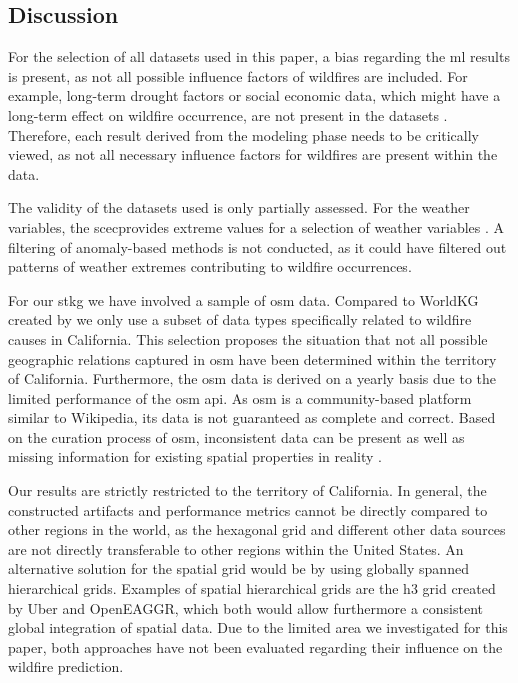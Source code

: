 \documentclass[
]{ceurart}
\begin{document}

\subsection{Discussion} \label{cha:Discussion}
For the selection of all datasets used in this paper, a bias regarding the \gls*{ml} results is present, as not all possible influence factors of wildfires are included. For example, long-term drought factors or social economic data, which might have a long-term effect on wildfire occurrence, are not present in the datasets \cite{Littell.2018}. Therefore, each result derived from the modeling phase needs to be critically viewed, as not all necessary influence factors for wildfires are present within the data.

The validity of the datasets used is only partially assessed. For the weather variables, the \gls*{scec}provides extreme values for a selection of weather variables \cite{StateClimateExtremesCommittee.2022}. A filtering of anomaly-based methods is not conducted, as it could have filtered out patterns of weather extremes contributing to wildfire occurrences.

For our \gls*{stkg} we have involved a sample of \gls*{osm} data. Compared to WorldKG created by \cite{Tempelmeier.2021} we only use a subset of data types specifically related to wildfire causes in California. This selection proposes the situation that not all possible geographic relations captured in \gls*{osm} have been determined within the territory of California. Furthermore, the \gls*{osm} data is derived on a yearly basis due to the limited performance of the \gls*{osm} \gls*{api}. As \gls*{osm} is a community-based platform similar to Wikipedia, its data is not guaranteed as complete and correct. Based on the curation process of \gls*{osm}, inconsistent data can be present as well as missing information for existing spatial properties in reality \cite{Basiri.2016}.

Our results are strictly restricted to the territory of California. In general, the constructed artifacts and performance metrics cannot be directly compared to other regions in the world, as the hexagonal grid and different other data sources are not directly transferable to other regions within the United States. An alternative solution for the spatial grid would be by using globally spanned hierarchical grids. Examples of spatial hierarchical grids are the h3 grid created by Uber and OpenEAGGR, which both would allow furthermore a consistent global integration of spatial data. Due to the limited area we investigated for this paper, both approaches have not been evaluated regarding their influence on the wildfire prediction.
\end{document}
